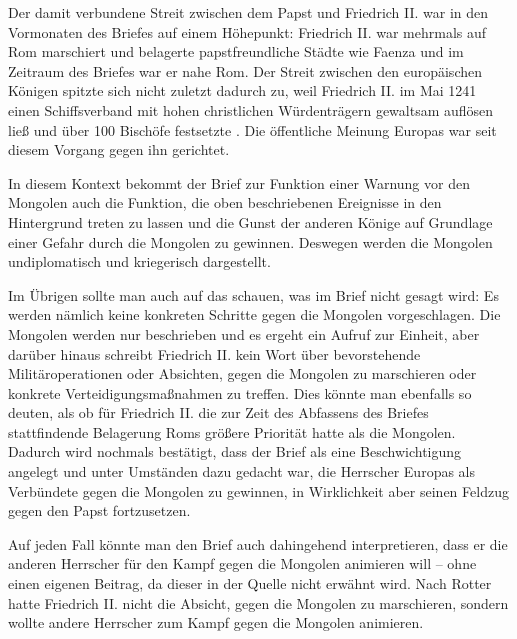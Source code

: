 \documentclass[12pt,headsepline,a4paper]{scrartcl}
\begin{document}
Der damit verbundene Streit zwischen dem Papst und Friedrich II. war in den
Vormonaten des Briefes auf einem Höhepunkt: Friedrich II. war mehrmals auf Rom
marschiert und belagerte papstfreundliche Städte wie Faenza und im Zeitraum des
Briefes war er nahe Rom. Der Streit zwischen den europäischen Königen spitzte sich
nicht zuletzt dadurch zu, weil Friedrich II. im Mai 1241 einen Schiffsverband mit hohen
christlichen Würdenträgern gewaltsam auflösen ließ und über 100 Bischöfe festsetzte\autocite[138]{rotter2000} .
Die öffentliche Meinung Europas war seit diesem Vorgang gegen ihn gerichtet.\autocite[69]{schaller1998}

In diesem Kontext bekommt der Brief zur Funktion einer Warnung vor den
Mongolen auch die Funktion, die oben beschriebenen Ereignisse in den Hintergrund
treten zu lassen und die Gunst der anderen Könige auf Grundlage einer Gefahr durch die
Mongolen zu gewinnen. Deswegen werden die Mongolen undiplomatisch und
kriegerisch dargestellt.

Im Übrigen sollte man auch auf das schauen, was im Brief nicht gesagt wird: Es
werden nämlich keine konkreten Schritte gegen die Mongolen vorgeschlagen. Die
Mongolen werden nur beschrieben und es ergeht ein Aufruf zur Einheit, aber darüber
hinaus schreibt Friedrich II. kein Wort über bevorstehende Militäroperationen oder
Absichten, gegen die Mongolen zu marschieren oder konkrete Verteidigungsmaßnahmen
zu treffen. Dies könnte man ebenfalls so deuten, als ob für Friedrich II. die zur Zeit des
Abfassens des Briefes stattfindende Belagerung Roms größere Priorität hatte als die
Mongolen. Dadurch wird nochmals bestätigt, dass der Brief als eine Beschwichtigung
angelegt und unter Umständen dazu gedacht war, die Herrscher Europas als Verbündete
gegen die Mongolen zu gewinnen, in Wirklichkeit aber seinen Feldzug gegen den Papst
fortzusetzen.

Auf jeden Fall könnte man den Brief auch dahingehend interpretieren, dass er
 die anderen Herrscher für den Kampf gegen die Mongolen animieren will –
ohne einen eigenen Beitrag, da dieser in der Quelle nicht erwähnt wird. Nach Rotter\autocite[138]{rotter2000}
 hatte Friedrich II. nicht die Absicht, gegen die Mongolen zu marschieren,
sondern wollte andere Herrscher zum Kampf gegen die Mongolen animieren.
\end{document}
